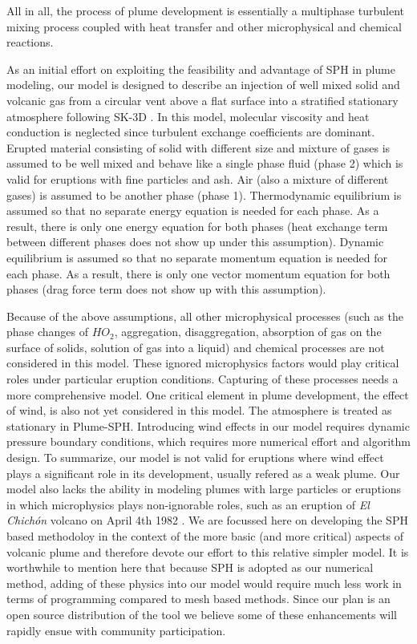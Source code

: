 All in all, the process of plume development is  essentially a multiphase turbulent mixing process coupled with heat transfer and other microphysical and chemical reactions.

As an initial effort on exploiting the feasibility and advantage of SPH in plume modeling, our model is designed to describe an injection of well mixed solid and volcanic gas from a circular vent above a flat surface into a stratified stationary atmosphere following SK-3D \citep{suzuki2005numerical}. In this model, molecular viscosity and heat conduction is neglected since turbulent exchange coefficients are dominant. Erupted material consisting of solid with different size and mixture of gases is assumed to be well mixed and behave like a single phase fluid (phase 2) which is valid for eruptions with fine particles and ash. Air (also a mixture of different gases) is assumed to be another phase (phase 1). Thermodynamic equilibrium is assumed so that no separate energy equation is needed for each phase. As a result, there is only one energy equation for both phases (heat exchange term between different phases does not show up under this assumption). Dynamic equilibrium is assumed so that no separate momentum equation is needed for each phase. As a result, there is only one vector momentum equation for both phases (drag force term does not show up with this assumption). 

Because of the above assumptions, all other microphysical processes (such as the phase changes of $HO_2$, aggregation, disaggregation, absorption of gas on the surface of solids, solution of gas into a liquid) and chemical processes are not considered in this model. These ignored microphysics factors would play critical roles under particular eruption conditions. Capturing of these processes needs a more comprehensive model. One critical element in plume development, the effect of wind, is also not yet considered in this model. The atmosphere is treated as stationary in Plume-SPH. Introducing wind effects in our model requires dynamic pressure boundary conditions, which requires more numerical effort and algorithm design. To summarize, our model is not valid for eruptions where wind effect plays a significant role in its development, usually refered as a weak plume. Our model also lacks the ability in modeling plumes with large particles or eruptions in which microphysics plays non-ignorable roles, such as an eruption of \textit{El Chich{\'o}n} volcano on April 4th 1982 \citep{sigurdsson19841982, folch2016fplume}. We are focussed here on developing the SPH based methodoloy in the context of the more basic (and more critical) aspects of volcanic plume and therefore devote our effort to this relative simpler model. It is worthwhile to mention here that because SPH is adopted as our numerical method, adding of these physics into our model would require much less work in terms of programming compared to mesh based methods. Since our plan is an open source distribution of the tool we believe some of these enhancements will rapidly ensue with community participation.


